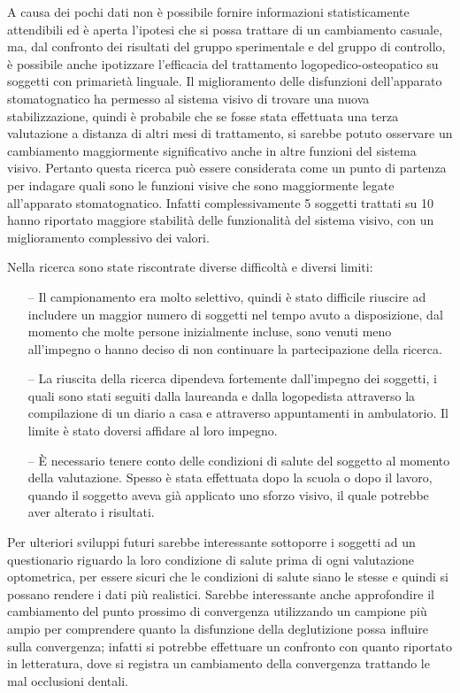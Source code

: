 A causa dei pochi dati non è possibile fornire informazioni statisticamente attendibili ed è aperta l’ipotesi che si possa trattare di un cambiamento casuale, ma, dal confronto dei risultati del gruppo sperimentale e del gruppo di controllo, è possibile anche ipotizzare l’efficacia del trattamento logopedico-osteopatico su soggetti con primarietà linguale. Il miglioramento delle disfunzioni dell’apparato stomatognatico ha permesso al sistema visivo di trovare una nuova stabilizzazione, quindi è probabile che se fosse stata effettuata una terza valutazione a distanza di altri mesi di trattamento, si sarebbe potuto osservare un cambiamento maggiormente significativo anche in altre funzioni del sistema visivo. Pertanto questa ricerca può essere considerata come un punto di partenza per indagare quali sono le funzioni visive che sono maggiormente legate all’apparato stomatognatico.  Infatti complessivamente 5 soggetti trattati su 10 hanno riportato maggiore stabilità delle funzionalità del sistema visivo, con un miglioramento complessivo dei valori. 

Nella ricerca sono state riscontrate diverse difficoltà e diversi limiti:
\begin{itemize}
 \itemsep-0.5em
 \item[--]Il campionamento era molto selettivo, quindi è stato difficile riuscire ad includere un maggior numero di soggetti nel tempo avuto a disposizione, dal momento che molte persone inizialmente incluse, sono venuti meno all’impegno o hanno deciso di non continuare la partecipazione della ricerca.
 \item[--]La riuscita della ricerca dipendeva fortemente dall’impegno dei soggetti, i quali sono stati seguiti dalla laureanda e dalla logopedista attraverso la compilazione di un diario a casa e attraverso appuntamenti in ambulatorio. Il limite è stato doversi affidare al loro impegno.
 \item[--]È necessario tenere conto delle condizioni di salute del soggetto al momento della valutazione. Spesso è stata effettuata dopo la scuola o dopo il lavoro, quando il soggetto aveva già applicato uno sforzo visivo, il quale potrebbe aver alterato i risultati.
\end{itemize}

Per ulteriori sviluppi futuri sarebbe interessante sottoporre i soggetti ad un questionario riguardo la loro condizione di salute prima di ogni valutazione optometrica, per essere sicuri che le condizioni di salute siano le stesse e quindi si possano rendere i dati più realistici. Sarebbe interessante anche approfondire il cambiamento del punto prossimo di convergenza utilizzando un campione più ampio per comprendere quanto la disfunzione della deglutizione possa influire sulla convergenza; infatti si potrebbe effettuare un confronto con quanto riportato in letteratura, dove si registra un cambiamento della convergenza trattando le mal occlusioni dentali. 

